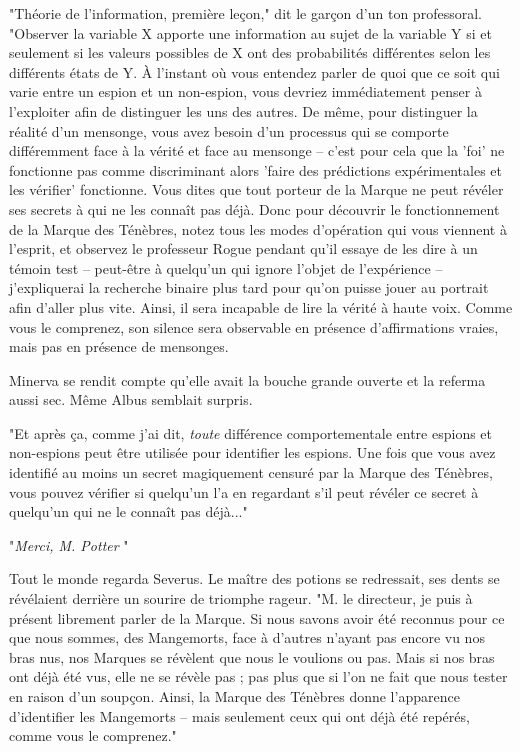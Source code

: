 "Théorie de l'information, première leçon," dit le garçon d'un ton professoral. "Observer la variable X apporte une information au sujet de la variable Y si et seulement si les valeurs possibles de X ont des probabilités différentes selon les différents états de Y. À l'instant où vous entendez parler de quoi que ce soit qui varie entre un espion et un non-espion, vous devriez immédiatement penser à l'exploiter afin de distinguer les uns des autres. De même, pour distinguer la réalité d'un mensonge, vous avez besoin d'un processus qui se comporte différemment face à la vérité et face au mensonge – c'est pour cela que la 'foi' ne fonctionne pas comme discriminant alors 'faire des prédictions expérimentales et les vérifier' fonctionne. Vous dites que tout porteur de la Marque ne peut révéler ses secrets à qui ne les connaît pas déjà. Donc pour découvrir le fonctionnement de la Marque des Ténèbres, notez tous les modes d'opération qui vous viennent à l'esprit, et observez le professeur Rogue pendant qu'il essaye de les dire à un témoin test – peut-être à quelqu'un qui ignore l'objet de l'expérience – j'expliquerai la recherche binaire plus tard pour qu'on puisse jouer au portrait afin d'aller plus vite. Ainsi, il sera incapable de lire la vérité à haute voix. Comme vous le comprenez, son silence sera observable en présence d'affirmations vraies, mais pas en présence de mensonges.

Minerva se rendit compte qu'elle avait la bouche grande ouverte et la referma aussi sec. Même Albus semblait surpris.

"Et après ça, comme j'ai dit, \emph{toute}  différence comportementale entre espions et non-espions peut être utilisée pour identifier les espions. Une fois que vous avez identifié au moins un secret magiquement censuré par la Marque des Ténèbres, vous pouvez vérifier si quelqu'un l'a en regardant s'il peut révéler ce secret à quelqu'un qui ne le connaît pas déjà..."

"\emph{Merci, M. Potter} "

Tout le monde regarda Severus. Le maître des potions se redressait, ses dents se révélaient derrière un sourire de triomphe rageur. "M. le directeur, je puis à présent librement parler de la Marque. Si nous savons avoir été reconnus pour ce que nous sommes, des Mangemorts, face à d'autres n'ayant pas encore vu nos bras nus, nos Marques se révèlent que nous le voulions ou pas. Mais si nos bras ont déjà été vus, elle ne se révèle pas ; pas plus que si l'on ne fait que nous tester en raison d'un soupçon. Ainsi, la Marque des Ténèbres donne l'apparence d'identifier les Mangemorts – mais seulement ceux qui ont déjà été repérés, comme vous le comprenez."

